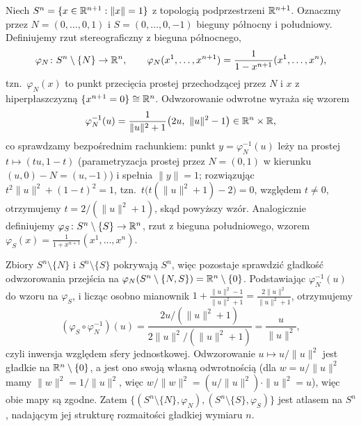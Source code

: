 \begin{przyklad}\label{prz:sfera}
Niech $S^n=\{x\in\mathbb{R}^{n+1}:\|x\|=1\}$ z topologią podprzestrzeni $\mathbb{R}^{n+1}$. Oznaczmy przez
$N=(0,\dots,0,1)$ i $S=(0,\dots,0,-1)$ bieguny północny i południowy. Definiujemy rzut
stereograficzny z bieguna północnego,
\[
\varphi_N\colon S^n\setminus\{N\}\to\mathbb{R}^n, \qquad
\varphi_N(x^1,\dots,x^{n+1})=\frac{1}{1-x^{n+1}}(x^1,\dots,x^n),
\]
tzn.\ $\varphi_N(x)$ to punkt przecięcia prostej przechodzącej przez $N$ i $x$ z
hiperpłaszczyzną $\{x^{n+1}=0\}\cong\mathbb{R}^n$. Odwzorowanie odwrotne wyraża się wzorem
\[
\varphi_N^{-1}(u)=\frac1{\|u\|^2+1}\big(2u,\ \|u\|^2-1\big)\in\R^n\times\R,
\]
co sprawdzamy bezpośrednim rachunkiem: punkt $y=\varphi_N^{-1}(u)$ leży na prostej
$t\mapsto(tu,1-t)$ (parametryzacja prostej przez $N=(0,1)$ w kierunku $(u,0)-N=(u,-1)$) i
spełnia $\|y\|=1$; rozwiązując $t^2\|u\|^2+(1-t)^2=1$, tzn.\ $t\big(t(\|u\|^2+1)-2\big)=0$,
względem $t\neq0$, otrzymujemy $t=2/(\|u\|^2+1)$, skąd powyższy wzór. Analogicznie
definiujemy $\varphi_S\colon S^n\setminus\{S\}\to\mathbb{R}^n$, rzut z bieguna południowego, wzorem
$\varphi_S(x)=\frac1{1+x^{n+1}}(x^1,\dots,x^n)$.

Zbiory $S^n\setminus\{N\}$ i $S^n\setminus\{S\}$ pokrywają $S^n$, więc pozostaje sprawdzić
gładkość odwzorowania przejścia na $\varphi_N(S^n\setminus\{N,S\})=\mathbb{R}^n\setminus\{0\}$.
Podstawiając $\varphi_N^{-1}(u)$ do wzoru na $\varphi_S$, i licząc osobno mianownik
$1+\frac{\|u\|^2-1}{\|u\|^2+1}=\frac{2\|u\|^2}{\|u\|^2+1}$,
otrzymujemy
\[
(\varphi_S\circ\varphi_N^{-1})(u)=\frac{2u/(\|u\|^2+1)}{2\|u\|^2/(\|u\|^2+1)}=
\frac{u}{\|u\|^2},
\]
czyli inwersja względem sfery jednostkowej. Odwzorowanie $u\mapsto u/\|u\|^2$ jest gładkie
na $\mathbb{R}^n\setminus\{0\}$, a jest ono swoją własną odwrotnością (dla $w=u/\|u\|^2$ mamy
$\|w\|^2=1/\|u\|^2$, więc $w/\|w\|^2=(u/\|u\|^2)\cdot\|u\|^2=u$), więc obie mapy są
zgodne. Zatem $\{(S^n\setminus\{N\},\varphi_N),(S^n\setminus\{S\},\varphi_S)\}$ jest
atlasem na $S^n$, nadającym jej strukturę rozmaitości gładkiej wymiaru $n$.
\end{przyklad}

